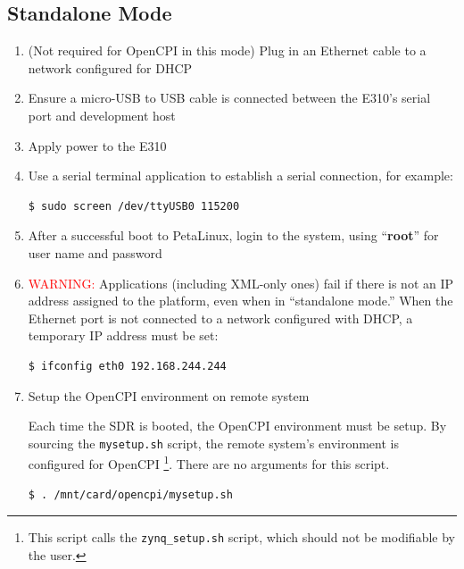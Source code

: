 \pagebreak
\subsection{Standalone Mode}
\begin{enumerate}
\item (Not required for OpenCPI in this mode) Plug in an Ethernet cable to a network configured for DHCP
\item Ensure a micro-USB to USB cable is connected between the E310's serial port and development host
\item Apply power to the E310
\item Use a serial terminal application to establish a serial connection, for example:

\begin{verbatim}
$ sudo screen /dev/ttyUSB0 115200
\end{verbatim}

\item After a successful boot to PetaLinux, login to the system, using  ``\textbf{root}'' for user name and password

\item \textcolor{red}{WARNING:}
Applications (including XML-only ones) fail if there is not an IP address assigned to the platform, even when in ``standalone mode.'' When the Ethernet port is not connected to a network configured with DHCP, a temporary IP address must be set:
\begin{verbatim}
$ ifconfig eth0 192.168.244.244
\end{verbatim} \medskip

\item Setup the OpenCPI environment on remote system

\begin{flushleft}
Each time the SDR is booted, the OpenCPI environment must be setup. By sourcing the \texttt{mysetup.sh} script, the remote system's environment is configured for OpenCPI \footnote{This script calls the \texttt{zynq\_setup.sh} script, which should not be modifiable by the user.}. There are no arguments for this script.
\begin{verbatim}
$ . /mnt/card/opencpi/mysetup.sh
\end{verbatim}


\end{flushleft}
\end{enumerate}
